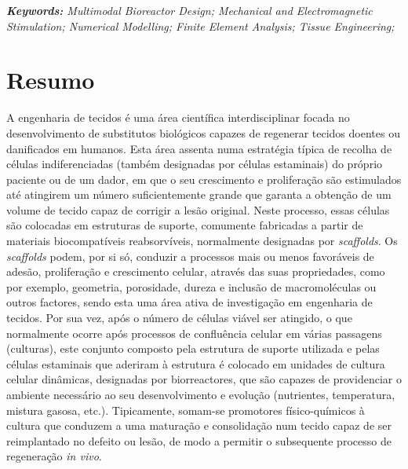 \documentclass[12pt]{report}
\begin{document}
\textit{\textbf{Keywords:} Multimodal Bioreactor Design; Mechanical and Electromagnetic Stimulation; Numerical Modelling; Finite Element Analysis; Tissue Engineering;}




\newpage
\section*{Resumo}
{}
A engenharia de tecidos é uma área científica interdisciplinar focada no desenvolvimento de substitutos biológicos capazes de regenerar tecidos doentes ou danificados em humanos. Esta área assenta numa estratégia típica de recolha de células indiferenciadas (também designadas por células estaminais) do próprio paciente ou de um dador, em que o seu crescimento e proliferação são estimulados até atingirem um número suficientemente grande que garanta a obtenção de um volume de tecido capaz de corrigir a lesão original. Neste processo, essas células são colocadas em estruturas de suporte, comumente fabricadas a partir de materiais biocompatíveis reabsorvíveis, normalmente designadas por \textit{scaffolds}. Os \textit{scaffolds} podem, por si só, conduzir a processos mais ou menos favoráveis de adesão, proliferação e crescimento celular, através das suas propriedades, como por exemplo, geometria, porosidade, dureza e inclusão de macromoléculas ou outros factores, sendo esta uma área ativa de investigação em engenharia de tecidos. Por sua vez, após o número de células viável ser atingido, o que normalmente ocorre após processos de confluência celular em várias passagens (culturas), este conjunto composto pela estrutura de suporte utilizada e pelas células estaminais que aderiram à estrutura é colocado em unidades de cultura celular dinâmicas, designadas por biorreactores, que são capazes de providenciar o ambiente necessário ao seu desenvolvimento e evolução (nutrientes, temperatura, mistura gasosa, etc.). Tipicamente, somam-se promotores físico-químicos à cultura que conduzem a uma maturação e consolidação num tecido capaz de ser reimplantado no defeito ou lesão, de modo a permitir o subsequente processo de regeneração \textit{in vivo}.
\end{document}
